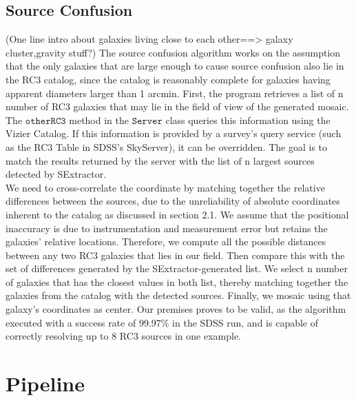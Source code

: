 \documentclass[5p]{elsarticle}
\begin{document}
	\subsection{Source Confusion}
	(One line intro about galaxies living close to each other==> galaxy cluster,gravity stuff?)
\indent The source confusion algorithm works on the assumption that the only galaxies that are large enough to cause source confusion also lie in the RC3 catalog, since the catalog is reasonably complete for galaxies having apparent diameters larger than 1 arcmin. First, the program retrieves a list of n number of RC3 galaxies that may lie in the field of view of the generated mosaic. The $\texttt{otherRC3}$ method in the $\texttt{Server}$ class queries this information using the Vizier Catalog. If this information is provided by a survey's query service (such as the RC3 Table in SDSS's SkyServer), it can be overridden. The goal is to match the results returned by the server with the list of n largest sources detected by SExtractor. 
\\
\indent  We need to cross-correlate the coordinate by matching together the relative differences between the sources, due to the unreliability of absolute coordinates inherent to the catalog as discussed in section 2.1. We assume that the positional inaccuracy is due to  instrumentation and measurement error but retains the galaxies' relative locations.  %
Therefore, we compute all the possible distances between any two RC3 galaxies that lies in our field. Then compare this with the set of differences generated by the SExtractor-generated list. We select n number of galaxies that has the closest values in both list, thereby matching together the galaxies from the catalog  with the detected sources. Finally, we mosaic using that galaxy's coordinates as center. Our premises proves to be valid, as the algorithm executed with a success rate of 99.97\% in the SDSS run, and is capable of correctly resolving up to 8 RC3 sources in one example.
\section{Pipeline}
\end{document}
